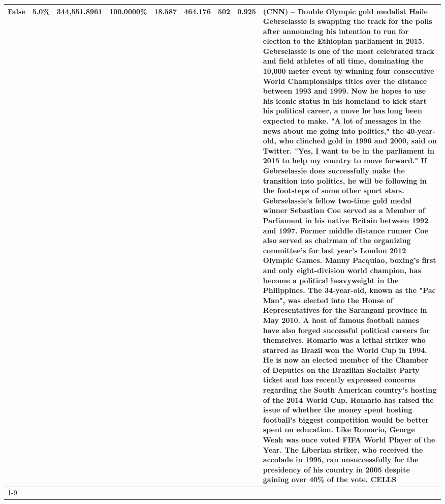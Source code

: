 \begin{table}[H]
{\begin{tabular}{lllrlllll}
False & 5.0\% & 344,551.8961 & \bfseries \color{red} 100.0000\% & 18.587 & 464.176 & 502 & 0.925 & (CNN) -- Double Olympic gold medalist Haile Gebrselassie is swapping the track for the polls after announcing his intention to run for election to the Ethiopian parliament in 2015. Gebrselassie is one of the most celebrated track and field athletes of all time, dominating the 10,000 meter event by winning four consecutive World Championships titles over the distance between 1993 and 1999. Now he hopes to use his iconic status in his homeland to kick start his political career, a move he has long been expected to make. "A lot of messages in the news about me going into politics," the 40-year-old, who clinched gold in 1996 and 2000, said on Twitter. "Yes, I want to be in the parliament in 2015 to help my country to move forward." If Gebrselassie does successfully make the transition into politics, he will be following in the footsteps of some other sport stars. Gebrselassie's fellow two-time gold medal winner Sebastian Coe served as a Member of Parliament in his native Britain between 1992 and 1997. Former middle distance runner Coe also served as chairman of the organizing committee's for last year's London 2012 Olympic Games. Manny Pacquiao, boxing's first and only eight-division world champion, has become a political heavyweight in the Philippines. The 34-year-old, known as the "Pac Man", was elected into the House of Representatives for the Sarangani province in May 2010. A host of famous football names have also forged successful political careers for themselves. Romario was a lethal striker who starred as Brazil won the World Cup in 1994. He is now an elected member of the Chamber of Deputies on the Brazilian Socialist Party ticket and has recently expressed concerns regarding the South American country's hosting of the 2014 World Cup. Romario has raised the issue of whether the money spent hosting football's biggest competition would be better spent on education. Like Romario, George Weah was once voted FIFA World Player of the Year. The Liberian striker, who received the accolade in 1995, ran unsuccessfully for the presidency of his country in 2005 despite gaining over 40\% of the vote. CELLS \\
\cline{1-9}

\end{tabular}}
\end{table}
